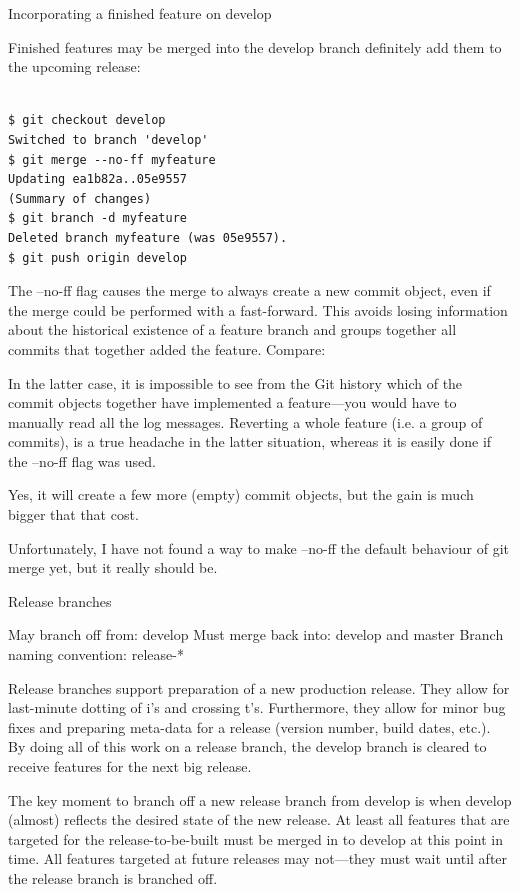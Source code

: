 Incorporating a finished feature on develop

Finished features may be merged into the develop branch definitely add them to
the upcoming release:\\\\
\begin{verbatim}
$ git checkout develop
Switched to branch 'develop'
$ git merge --no-ff myfeature
Updating ea1b82a..05e9557
(Summary of changes)
$ git branch -d myfeature
Deleted branch myfeature (was 05e9557).
$ git push origin develop
\end{verbatim}

The --no-ff flag causes the merge to always create a new commit object, even if
the merge could be performed with a fast-forward. This avoids losing information
about the historical existence of a feature branch and groups together all
commits that together added the feature. Compare:

In the latter case, it is impossible to see from the Git history which of the
commit objects together have implemented a feature—you would have to manually
read all the log messages. Reverting a whole feature (i.e. a group of commits),
is a true headache in the latter situation, whereas it is easily done if the
--no-ff flag was used.

Yes, it will create a few more (empty) commit objects, but the gain is much
bigger that that cost.

Unfortunately, I have not found a way to make --no-ff the default behaviour of
git merge yet, but it really should be.

Release branches

May branch off from: develop
Must merge back into: develop and master
Branch naming convention: release-*

Release branches support preparation of a new production release. They allow for
last-minute dotting of i’s and crossing t’s. Furthermore, they allow for minor
bug fixes and preparing meta-data for a release (version number, build dates,
etc.). By doing all of this work on a release branch, the develop branch is
cleared to receive features for the next big release.

The key moment to branch off a new release branch from develop is when develop
(almost) reflects the desired state of the new release. At least all features
that are targeted for the release-to-be-built must be merged in to develop at
this point in time. All features targeted at future releases may not—they must
wait until after the release branch is branched off.

